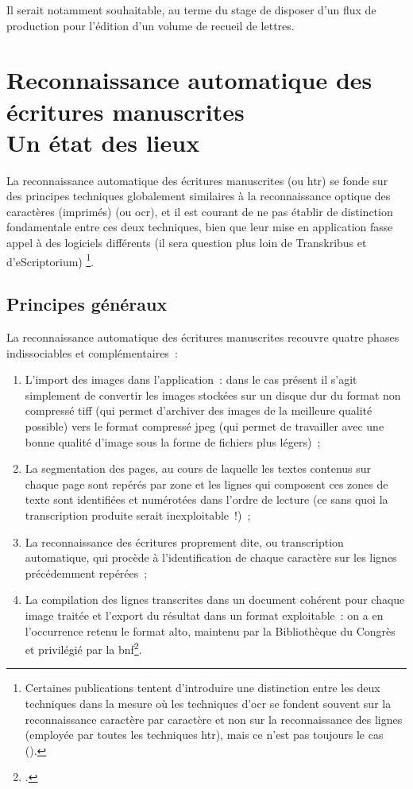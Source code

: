 \documentclass[a4paper,12pt,twoside]{book}
\begin{document}
			Il serait notamment souhaitable, au terme du stage de disposer d'un flux de production pour l'édition d'un volume de recueil de lettres.
				
	\chapter[HTR~: état des lieux]{Reconnaissance automatique des écritures manuscrites \\ \large Un état des lieux}
		
		La reconnaissance automatique des écritures manuscrites (ou \gls{htr}) se fonde sur des principes techniques globalement similaires à la reconnaissance optique des caractères (imprimés) (ou \gls{ocr}), et il est courant de ne pas établir de distinction fondamentale entre ces deux techniques, bien que leur mise en application fasse appel à des logiciels différents (il sera question plus loin de Transkribus et d'eScriptorium)
		\footnote{Certaines publications tentent d'introduire une distinction entre les deux techniques dans la mesure où les techniques d'\gls{ocr} se fondent souvent sur la reconnaissance caractère par caractère et non sur la reconnaissance des lignes (employée par toutes les techniques \gls{htr}), mais ce n'est pas toujours le cas (\cite{stokesEScriptoriumVREManuscript2021}).}.
		
		\section{Principes généraux}
		
			La reconnaissance automatique des écritures manuscrites recouvre quatre phases indissociables et complémentaires~:
			
			\begin{enumerate}
				\item L'import des images dans l'application~: dans le cas présent il s'agit simplement de convertir les images stockées sur un disque dur du format non compressé \textsf{tiff} (qui permet d'archiver des images de la meilleure qualité possible) vers le format compressé \textsf{jpeg} (qui permet de travailler avec une bonne qualité d'image sous la forme de fichiers plus légers)~;
				\item La \gls{segmentation} des pages, au cours de laquelle les textes contenus sur chaque page sont repérés par zone et les lignes qui composent ces zones de texte sont identifiées et numérotées dans l'ordre de lecture (ce sans quoi la transcription produite serait inexploitable~!)~;
				\item La reconnaissance des écritures proprement dite, ou transcription automatique, qui procède à l'identification de chaque caractère sur les lignes précédemment repérées~;
				\item La compilation des lignes transcrites dans un document cohérent pour chaque image traitée et l'export du résultat dans un format exploitable~: on a en l'occurrence retenu le format \gls{alto}, maintenu par la Bibliothèque du Congrès et privilégié par la \gls{bnf}\footcite{TechniquesFormatsConversion2022, stokesEScriptoriumVREManuscript2021}.
			\end{enumerate}
			
\end{document}
